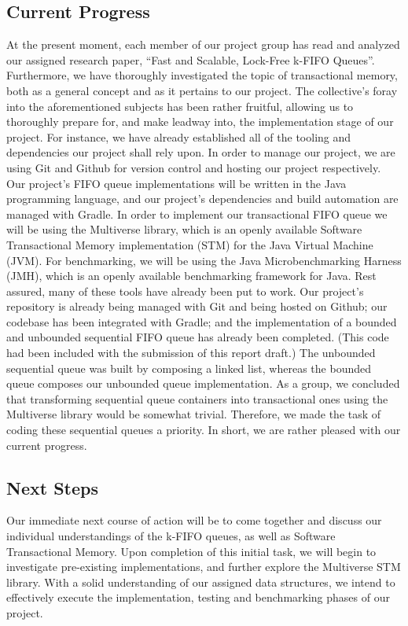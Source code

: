 \documentclass[a4paper, 10pt, conference]{ieeeconf}      %
\begin{document}
\subsection{Current Progress}
At the present moment, each member of our project group has read and analyzed our assigned research paper, “Fast and Scalable, Lock-Free k-FIFO Queues”. Furthermore, we have thoroughly investigated the topic of transactional memory, both as a general concept and as it pertains to our project. The collective’s foray into the aforementioned subjects has been rather fruitful, allowing us to thoroughly prepare for, and make leadway into, the implementation stage of our project. For instance, we have already established all of the tooling and dependencies our project shall rely upon. 
In order to manage our project, we are using Git and Github for version control and hosting our project respectively. Our project’s FIFO queue implementations will be written in the Java programming language, and our project’s dependencies and build automation are managed with Gradle. In order to implement our transactional FIFO queue we will be using the Multiverse library, which is an openly available Software Transactional Memory implementation (STM) for the Java Virtual Machine (JVM). For benchmarking, we will be using the Java Microbenchmarking Harness (JMH), which is an openly available benchmarking framework for Java.
Rest assured, many of these tools have already been put to work. Our project’s repository is already being managed with Git and being hosted on Github; our codebase has been integrated with Gradle; and the implementation of a bounded and unbounded sequential FIFO queue has already been completed. (This code had been included with the submission of this report draft.) The unbounded sequential queue was built by composing a linked list, whereas the bounded queue composes our unbounded queue implementation. As a group, we concluded that transforming sequential queue containers into transactional ones using the Multiverse library would be somewhat trivial. Therefore, we made the task of coding these sequential queues a priority. In short, we are rather pleased with our current progress.
\subsection{Next Steps}
Our immediate next course of action will be to come together and discuss our individual understandings of the k-FIFO queues, as well as Software Transactional Memory. Upon completion of this initial task, we will begin to investigate pre-existing implementations, and further explore the Multiverse STM library. With a solid understanding of our assigned data structures, we intend to effectively execute the implementation, testing and benchmarking phases of our project.

\printbibliography
\end{document}

